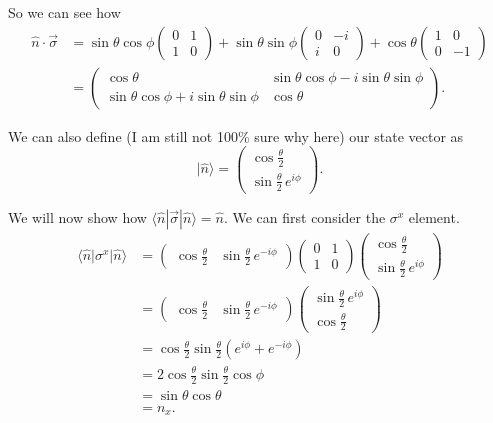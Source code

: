 \documentclass[12pt]{revtex4-2}
\begin{document}
So we can see how
\begin{align}
    \hat{n} \cdot \vec{\sigma} &= \sin\theta\cos\phi \begin{pmatrix}
        0 & 1 \\ 1 & 0 
    \end{pmatrix} + \sin\theta\sin\phi \begin{pmatrix}
        0 & -i \\ i & 0 
    \end{pmatrix} + \cos\theta \begin{pmatrix}
        1 & 0 \\ 0 & -1
    \end{pmatrix} \\
    &= \begin{pmatrix}
        \cos\theta & \sin\theta \cos\phi - i\sin\theta \sin\phi \\
        \sin\theta \cos\phi + i\sin\theta \sin\phi & \cos\theta
    \end{pmatrix}.
\end{align}

We can also define (I am still not 100\% sure why here) our state vector as
\begin{equation}
    |\hat{n} \rangle = \begin{pmatrix}
        \cos\frac{\theta}{2} \\ \sin\frac{\theta}{2} \, e^{i\phi}
    \end{pmatrix}.
\end{equation}

We will now show how $\langle \hat{n} | \vec{\sigma} | \hat{n} \rangle = \hat{n}$.  We can first consider the $\sigma^x$ element.
\begin{align}
    \langle \hat{n} | \sigma^x | \hat{n} \rangle &= \begin{pmatrix}
        \cos\frac{\theta}{2} & \sin\frac{\theta}{2} \, e^{-i\phi}
    \end{pmatrix} \begin{pmatrix}
        0 & 1 \\ 1 & 0
    \end{pmatrix} \begin{pmatrix}
        \cos\frac{\theta}{2} \\ \sin\frac{\theta}{2} \, e^{i\phi}
    \end{pmatrix} \\
    &= \begin{pmatrix}
        \cos\frac{\theta}{2} & \sin\frac{\theta}{2} \, e^{-i\phi}
    \end{pmatrix} \begin{pmatrix}
        \sin\frac{\theta}{2} \, e^{i\phi} \\ \cos\frac{\theta}{2}
    \end{pmatrix} \\
    &= \cos\frac{\theta}{2} \sin\frac{\theta}{2} \left( e^{i\phi} + e^{-i\phi} \right) \\
    &= 2\cos\frac{\theta}{2} \sin\frac{\theta}{2} \cos\phi \\
    &= \sin\theta \cos\theta \\
    &= n_x.
\end{align}
\end{document}
